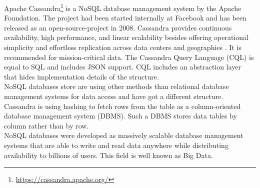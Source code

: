 Apache Cassandra\footnote{\url{https://cassandra.apache.org/}} is a NoSQL database management system by the Apache Foundation. The project had been started internally at Facebook and has been released as an open-source-project in 2008. Cassandra provides continuous availability, high performance, and linear scalability besides  offering operational simplicity and effortless replication across data centers and geographies \cite{Datastax}. It is recommended for mission-critical data. The Cassandra Query Language (CQL) is equal to SQL and includes JSON support. CQL includes an abstraction layer that hides implementation details of the structure.  \\
NoSQL databases store are using other methods than relational database management systems for data access and have got a different structure. Cassandra is using hashing to fetch rows from the table as a column-oriented database management system (DBMS). Such a DBMS stores data tables by column rather than by row. \\ 
NoSQL databases were developed as massively scalable database management systems that are able to write and read data anywhere while distributing availability to billions of users. This field is well known as Big Data.